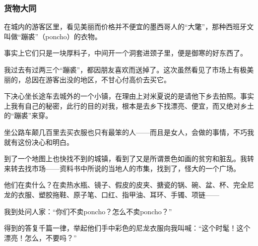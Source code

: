 \subsubsection*{货物大同}
\par 在城内的游客区里，看见美丽而价格并不便宜的墨西哥人的“大氅”，那种西班牙文叫做“蹦裘”（poncho）的衣物。
\par 事实上它们只是一块厚料子，中间开一个洞套进颈子里，便是御寒的好东西了。
\par 我过去有过两三个“蹦裘”，都因朋友喜欢而送掉了。这次虽然看见了市场上有极美丽的，总因在游客出没的地区，不甘心付高价去买它。
\par 下决心坐长途车去城外的一个小镇，在理由上对米夏说的是请他下乡去拍照。事实上我有自己的秘密，此行的目的对我，根本是去乡下找漂亮、便宜，而又绝对乡土的“蹦裘”来穿。
\par 坐公路车颠几百里去买衣服也只有最笨的人——而且是女人，会做的事情，不巧我就有这份决心和明白。
\par 到了一个地图上也快找不到的城镇，看到了又是所谓景色如画的贫穷和脏乱。我转来转去找市场——资料书中所说的当地人的市集，找到了，怪大的一个广场。
\par 他们在卖什么？在卖热水瓶、镜子、假皮的皮夹、搪瓷的锅、碗、盆、杯、完全尼龙的衣服、塑胶拖鞋、原子笔、口红、指甲油、耳环、手镯、项链——
\par 我到处问人家：“你们不卖poncho？怎么不卖poncho？”
\par 得到的答复千篇一律，举起他们手中彩色的尼龙衣服向我叫喊：“这个时髦！这个漂亮！怎么，不要吗？”

